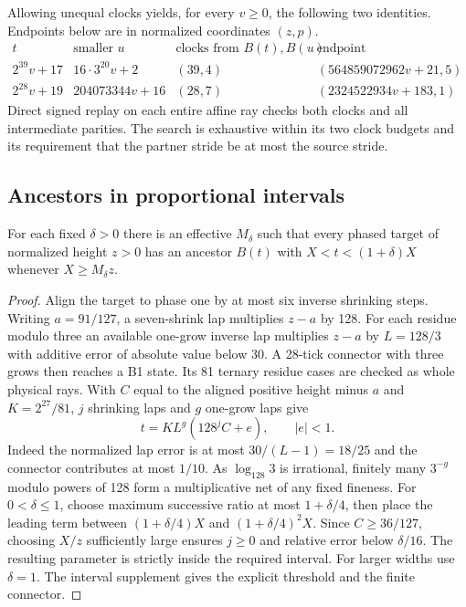 Allowing unequal clocks yields, for every $v\ge0$, the following two
identities. Endpoints below are in normalized coordinates $(z,p)$.
\[
\begin{array}{c|c|c|c}
t&\text{smaller }u&\text{clocks from }B(t),B(u)&\text{endpoint}\\\hline
2^{39}v+17&16\cdot3^{20}v+2&(39,4)&(564859072962v+21,5)\\
2^{28}v+19&204073344v+16&(28,7)&(2324522934v+183,1)
\end{array}
\]
Direct signed replay on each entire affine ray checks both clocks and
all intermediate parities. The search is exhaustive within its two clock
budgets and its requirement that the partner stride be at most the source
stride.

\subsection{Ancestors in proportional intervals}
\label{sec:inverse-intervals}

\begin{theorem}\label{thm:inverse-interval}
For each fixed $\delta>0$ there is an effective $M_\delta$ such that every
phased target of normalized height $z>0$ has an ancestor $B(t)$ with
$X<t<(1+\delta)X$ whenever $X\ge M_\delta z$.
\end{theorem}
\begin{proof}
Align the target to phase one by at most six inverse shrinking steps.
Writing $a=91/127$, a seven-shrink lap multiplies $z-a$ by 128. For
each residue modulo three an available one-grow inverse lap multiplies
$z-a$ by $L=128/3$ with additive error of absolute value below 30.
A 28-tick connector with three grows then reaches a B1 state. Its 81
ternary residue cases are checked as whole physical rays. With $C$
equal to the aligned positive height minus $a$ and $K=2^{27}/81$,
$j$ shrinking laps and $g$ one-grow laps give
\[
 t=K L^g(128^j C+e),\qquad |e|<1.
\]
Indeed the normalized lap error is at most $30/(L-1)=18/25$ and the
connector contributes at most $1/10$. As $\log_{128}3$ is irrational,
finitely many $3^{-g}$ modulo powers of 128 form a multiplicative
net of any fixed fineness. For $0<\delta\le1$, choose maximum successive
ratio at most $1+\delta/4$, then place the leading term between
$(1+\delta/4)X$ and $(1+\delta/4)^2X$. Since $C\ge36/127$, choosing
$X/z$ sufficiently large ensures $j\ge0$ and relative error below
$\delta/16$. The resulting parameter is strictly inside the required
interval. For larger widths use $\delta=1$. The interval supplement
gives the explicit threshold and the finite connector.
\end{proof}

